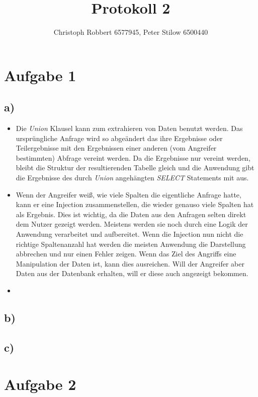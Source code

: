 \documentclass[10pt,a4paper]{article}
\author{Christoph Robbert 6577945, Peter Stilow 6500440}
\title{Protokoll 2}
\begin{document}
\maketitle
 
\section*{Aufgabe 1}

\subsection*{a)}
\begin{itemize}
	\item Die \textit{Union} Klausel kann zum extrahieren von Daten benutzt werden. Das ursprüngliche Anfrage wird so abgeändert das ihre Ergebnisse oder Teilergebnisse mit den Ergebnissen einer anderen (vom Angreifer bestimmten) Abfrage vereint werden. Da die Ergebnisse nur vereint werden, bleibt die Struktur der resultierenden Tabelle gleich und die Anwendung gibt die Ergebnisse des durch \textit{Union} angehängten \textit{SELECT} Statements mit aus.
	\item Wenn der Angreifer weiß, wie viele Spalten die eigentliche Anfrage hatte, kann er eine Injection zusammenstellen, die wieder genauso viele Spalten hat als Ergebnis. Dies ist wichtig, da die Daten aus den Anfragen selten direkt dem Nutzer gezeigt werden. Meistens werden sie noch durch eine Logik der Anwendung verarbeitet und aufbereitet. Wenn die Injection nun nicht die richtige Spaltenanzahl hat werden die meisten Anwendung die Darstellung abbrechen und nur einen Fehler zeigen. Wenn das Ziel des Angriffs eine Manipulation der Daten ist, kann dies ausreichen. Will der Angreifer aber Daten aus der Datenbank erhalten, will er diese auch angezeigt bekommen.
	\item 
\end{itemize}
\subsection*{b)}


\subsection*{c)}

\section*{Aufgabe 2}
\end{document}
